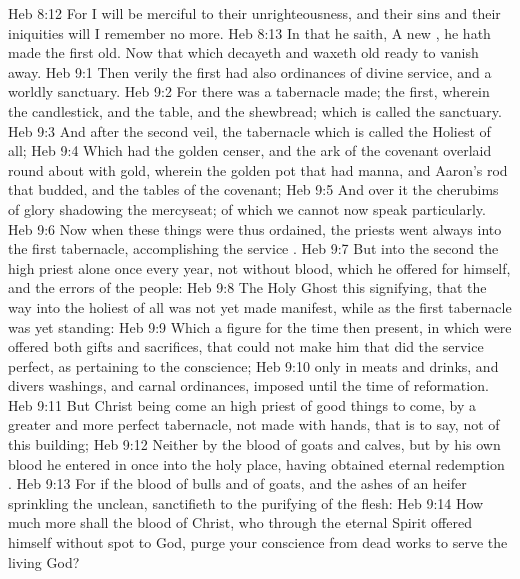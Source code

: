 \vs Heb 8:12 For I will be merciful to their unrighteousness, and their sins and their iniquities will I remember no more.
\vs Heb 8:13 In that he saith, A new , he hath made the first old. Now that which decayeth and waxeth old  ready to vanish away.
\vs Heb 9:1 Then verily the first  had also ordinances of divine service, and a worldly sanctuary.
\vs Heb 9:2 For there was a tabernacle made; the first, wherein  the candlestick, and the table, and the shewbread; which is called the sanctuary.
\vs Heb 9:3 And after the second veil, the tabernacle which is called the Holiest of all;
\vs Heb 9:4 Which had the golden censer, and the ark of the covenant overlaid round about with gold, wherein  the golden pot that had manna, and Aaron's rod that budded, and the tables of the covenant;
\vs Heb 9:5 And over it the cherubims of glory shadowing the mercyseat; of which we cannot now speak particularly.
\vs Heb 9:6 Now when these things were thus ordained, the priests went always into the first tabernacle, accomplishing the service .
\vs Heb 9:7 But into the second  the high priest alone once every year, not without blood, which he offered for himself, and  the errors of the people:
\vs Heb 9:8 The Holy Ghost this signifying, that the way into the holiest of all was not yet made manifest, while as the first tabernacle was yet standing:
\vs Heb 9:9 Which  a figure for the time then present, in which were offered both gifts and sacrifices, that could not make him that did the service perfect, as pertaining to the conscience;
\vs Heb 9:10  only in meats and drinks, and divers washings, and carnal ordinances, imposed  until the time of reformation.
\vs Heb 9:11 But Christ being come an high priest of good things to come, by a greater and more perfect tabernacle, not made with hands, that is to say, not of this building;
\vs Heb 9:12 Neither by the blood of goats and calves, but by his own blood he entered in once into the holy place, having obtained eternal redemption .
\vs Heb 9:13 For if the blood of bulls and of goats, and the ashes of an heifer sprinkling the unclean, sanctifieth to the purifying of the flesh:
\vs Heb 9:14 How much more shall the blood of Christ, who through the eternal Spirit offered himself without spot to God, purge your conscience from dead works to serve the living God?
